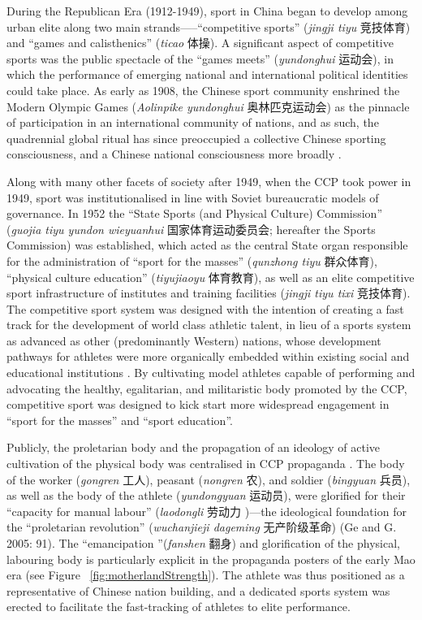 \begin{CJK}{UTF8}{gbsn}
During the Republican Era (1912-1949), sport in China began to develop among urban elite along two main strands—--``competitive sports'' (\textit{jingji tiyu} 竞技体育) and ``games and calisthenics'' (\textit{ticao} 体操).  A significant aspect of competitive sports was the public spectacle of the ``games meets'' (\textit{yundonghui} 运动会), in which the performance of emerging national and international political identities could take place.  As early as 1908, the Chinese sport community enshrined the Modern Olympic Games (\textit{Aolinpike yundonghui} 奥林匹克运动会) as the pinnacle of participation in an international community of nations, and as such, the quadrennial global ritual has since preoccupied a collective Chinese sporting consciousness, and a Chinese national consciousness more broadly \citep{Jarvie2008,Barme2009,Brownell2008,Morris2004}.

Along with many other facets of society after 1949, when the CCP took power in 1949, sport was institutionalised in line with Soviet bureaucratic models of governance.  In 1952 the ``State Sports (and Physical Culture) Commission'' (\textit{guojia tiyu yundon wieyuanhui} 国家体育运动委员会; hereafter the Sports Commission) was established, which acted as the central State organ responsible for the administration of ``sport for the masses'' (\textit{qunzhong tiyu} 群众体育), ``physical culture education'' (\textit{tiyujiaoyu} 体育教育), as well as an elite competitive sport infrastructure of institutes and training facilities (\textit{jingji tiyu tixi} 竞技体育).
The competitive sport system was designed with the intention of creating a fast track for the development of world class athletic talent, in lieu of a sports system as advanced as other (predominantly Western) nations, whose development pathways for athletes were more organically embedded within existing social and educational institutions \citep{Brownell2008}.  By cultivating model athletes capable of performing and advocating the healthy, egalitarian, and militaristic body promoted by the CCP, competitive sport was designed to kick start more widespread engagement in ``sport for the masses'' and ``sport education''\citep[56]{Brownell1995}.

Publicly, the proletarian body and the propagation of an ideology of active cultivation of the physical body was centralised in CCP propaganda \citep[58]{Brownell1995}.  The body of the worker (\textit{gongren} 工人), peasant (\textit{nongren} 农), and soldier (\textit{bingyuan} 兵员), as well as the body of the athlete (\textit{yundongyuan} 运动员), were glorified for their ``capacity for manual labour'' (\textit{laodongli} 劳动力 )---the ideological foundation for the ``proletarian revolution'' (\textit{wuchanjieji dageming} 无产阶级革命) (Ge and G. 2005: 91).
The ``emancipation ''(\textit{fanshen} 翻身) and glorification of the physical, labouring body is particularly explicit in the propaganda posters of the early Mao era \citep[87]{Ge2005} (see Figure ~\ref{fig:motherlandStrength}).  The athlete was thus positioned as a representative of Chinese nation building, and a dedicated sports system was erected to facilitate the fast-tracking of athletes to elite performance.


\end{CJK}

